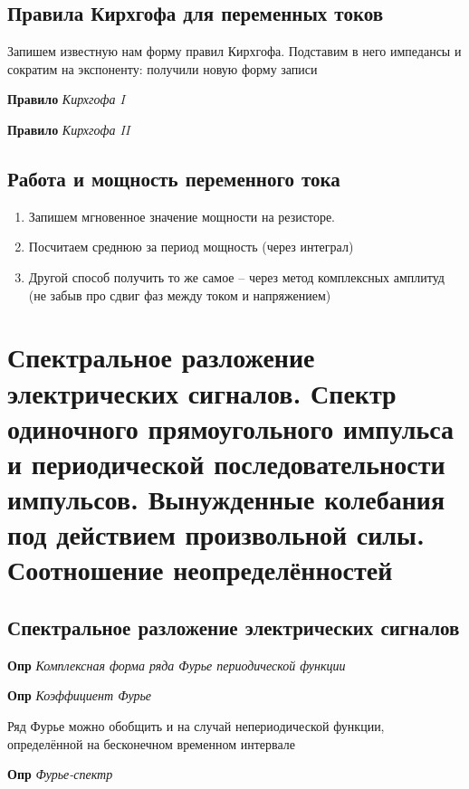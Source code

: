 \documentclass[a4paper, 14pt]{article}
\begin{document}
    \subsection{Правила Кирхгофа для переменных токов}
    
    Запишем известную нам форму правил Кирхгофа.
    Подставим в него импедансы и сократим на экспоненту: получили новую форму записи
    
    \textbf{Правило} \textit{Кирхгофа I}
    
    \textbf{Правило} \textit{Кирхгофа II}
    
    \subsection{Работа и мощность переменного тока}
    
    \begin{enumerate}
        \item Запишем мгновенное значение мощности на резисторе.
        \item Посчитаем среднюю за период мощность (через интеграл)
        \item Другой способ получить то же самое -- через метод комплексных амплитуд (не забыв про сдвиг фаз между
        током и напряжением)
    \end{enumerate}
    
    \section{Спектральное разложение электрических сигналов.
    Спектр одиночного прямоугольного импульса и периодической последовательности импульсов.
    Вынужденные колебания под действием произвольной силы.
    Соотношение неопределённостей}
    
    \subsection{Спектральное разложение электрических сигналов}
    
    \textbf{Опр} \textit{Комплексная форма ряда Фурье периодической функции}
    
    \textbf{Опр} \textit{Коэффициент Фурье}
    
    Ряд Фурье можно обобщить и на случай непериодической функции, определённой на бесконечном временном интервале
    
    \textbf{Опр} \textit{Фурье-спектр}
    
\end{document}
